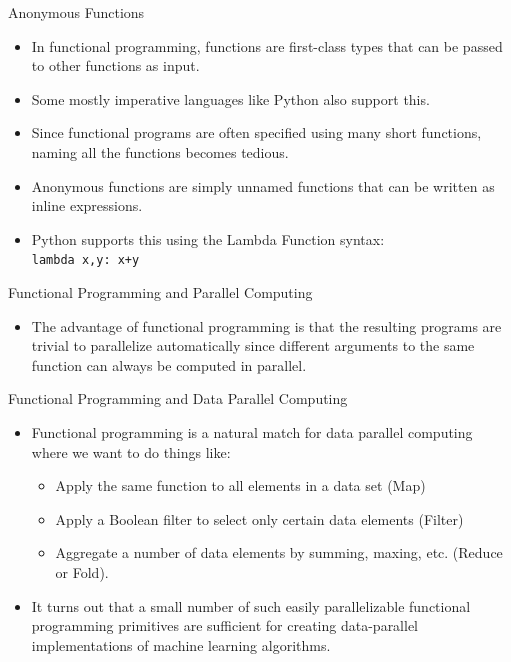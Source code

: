 \documentclass[serif,xcolor=pdftex,dvipsnames,table,hyperref={bookmarks=false,breaklinks}]{beamer}
\begin{document}
\begin{frame}[t]{Anonymous Functions}
\begin{itemize}
\item In functional programming, functions are first-class types that can be 
passed to other functions as input.

\pause\item Some mostly imperative languages like Python also support this.

\pause\item Since functional programs are often specified using many short 
functions, naming all the functions becomes tedious. 

\pause\item Anonymous functions are simply unnamed functions that can be 
written as inline expressions.

\pause\item Python supports this using the Lambda Function syntax:\\

\pause\center
{\Large \texttt{lambda x,y: x+y}}


\end{itemize}
\end{frame}

\begin{frame}[t]{Functional Programming and Parallel Computing}
\begin{itemize}
\item The advantage of functional programming is that the resulting 
programs are trivial to parallelize automatically since different arguments
to the same function can always be computed in parallel. 


\end{itemize}
\end{frame}

\begin{frame}[t]{Functional Programming and Data Parallel Computing}
\begin{itemize}
\item Functional programming is a natural match for data parallel computing
where we want to do things like:

\begin{itemize}
\pause \item Apply the same function to all elements in a 
data set (Map) 
\pause \item Apply a Boolean filter to select only certain data elements 
(Filter)
\pause \item Aggregate a number of data elements by summing, maxing, etc. 
(Reduce or Fold).
\end{itemize}

\pause \item It turns out that a small number of such easily parallelizable 
functional programming primitives are sufficient for creating data-parallel
implementations of machine learning algorithms. 

\end{itemize}
\end{frame}
\end{document}
